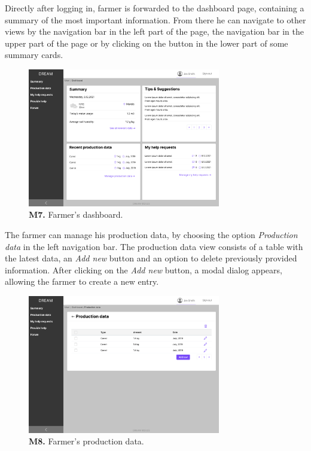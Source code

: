 Directly after logging in, farmer is forwarded to the dashboard page, containing a summary of the most important information. From there he can navigate to other views by the navigation bar in the left part of the page, the navigation bar in the upper part of the page or by clicking on the button in the lower part of some summary cards.  
\begin{figure}[H]
    \centering
    \includegraphics[width=0.75\textwidth]{mockups/Farmer_Dashboard.png}
    \caption{\textbf{M7.} Farmer's dashboard.}
\end{figure}

The farmer can manage his production data, by choosing the option \textit{Production data} in the left navigation bar. The production data view consists of a table with the latest data, an \textit{Add new} button and an option to delete previously provided information. After clicking on the \textit{Add new} button, a modal dialog appears, allowing the farmer to create a new entry.
\begin{figure}[H]
    \centering
    \includegraphics[width=0.75\textwidth]{mockups/Farmer_Dashboard_Production data.png}
    \caption{\textbf{M8.} Farmer's production data.}
\end{figure}

